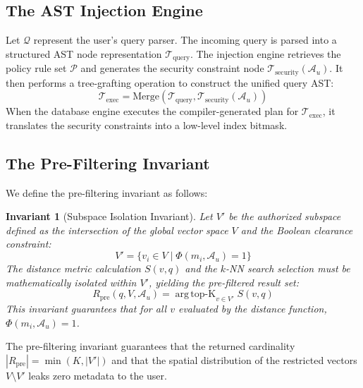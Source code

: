 \documentclass[sigconf]{acmart}
\newtheorem{invariant}{Invariant}
\begin{document}
\subsection{The AST Injection Engine}
Let $\mathcal{Q}$ represent the user's query parser. The incoming query is parsed into a structured AST node representation $\mathcal{T}_{\text{query}}$. The injection engine retrieves the policy rule set $\mathcal{P}$ and generates the security constraint node $\mathcal{T}_{\text{security}}(\mathcal{A}_u)$. It then performs a tree-grafting operation to construct the unified query AST:
\begin{equation}
    \mathcal{T}_{\text{exec}} = \text{Merge}(\mathcal{T}_{\text{query}}, \mathcal{T}_{\text{security}}(\mathcal{A}_u))
\end{equation}
When the database engine executes the compiler-generated plan for $\mathcal{T}_{\text{exec}}$, it translates the security constraints into a low-level index bitmask.

\subsection{The Pre-Filtering Invariant}
We define the pre-filtering invariant as follows:
\begin{invariant}[Subspace Isolation Invariant]
Let $V'$ be the authorized subspace defined as the intersection of the global vector space $V$ and the Boolean clearance constraint:
\begin{equation}
    V' = \{ v_i \in V \mid \Phi(m_i, \mathcal{A}_u) = 1 \}
\end{equation}
The distance metric calculation $S(v, q)$ and the $k$-NN search selection must be mathematically isolated within $V'$, yielding the pre-filtered result set:
\begin{equation}
    R_{\text{pre}}(q, V, \mathcal{A}_u) = \operatorname{arg\,top-K}_{v \in V'} S(v, q)
\end{equation}
This invariant guarantees that for all $v$ evaluated by the distance function, $\Phi(m_i, \mathcal{A}_u) = 1$.
\end{invariant}

\begin{theorem}
The pre-filtering invariant guarantees that the returned cardinality $|R_{\text{pre}}| = \min(K, |V'|)$ and that the spatial distribution of the restricted vectors $V \setminus V'$ leaks zero metadata to the user.
\end{theorem}
\end{document}
